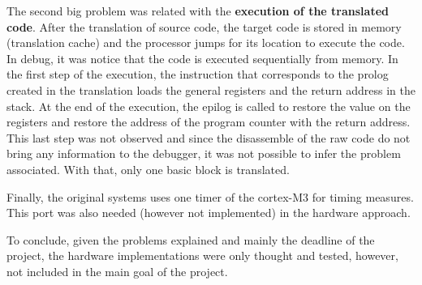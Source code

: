 The second big problem was related with the \textbf{execution of the translated code}. After the translation of source code, the target code is stored in memory (translation cache) and the processor jumps for its location to execute the code. In debug, it was notice that the code is executed sequentially from memory. In the first step of the execution, the instruction that corresponds to the prolog created in the translation loads the general registers and the return address in the stack. At the end of the execution, the epilog is called to restore the value on the registers and restore the address of the program counter with the return address. This last step was not observed and since the disassemble of the raw code do not bring any information to the debugger, it was not possible to infer the problem associated. With that, only one basic block is translated. 

Finally, the original systems uses one timer of the cortex-M3 for timing measures. This port was also needed (however not implemented) in the hardware approach.

To conclude, given the problems explained and mainly the deadline of the project, the hardware implementations were only thought and tested, however, not included in the main goal of the project.

